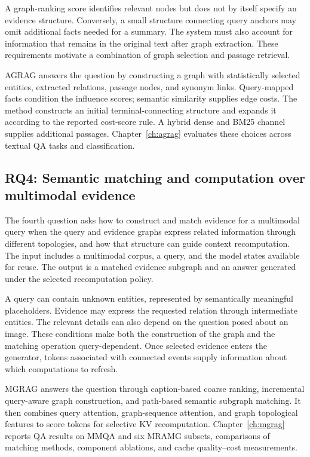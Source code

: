 A graph-ranking score identifies relevant nodes but does not by itself specify an evidence structure. Conversely, a small structure connecting query anchors may omit additional facts needed for a summary. The system must also account for information that remains in the original text after graph extraction. These requirements motivate a combination of graph selection and passage retrieval.

AGRAG answers the question by constructing a graph with statistically selected entities, extracted relations, passage nodes, and synonym links. Query-mapped facts condition the influence scores; semantic similarity supplies edge costs. The method constructs an initial terminal-connecting structure and expands it according to the reported cost-score rule. A hybrid dense and BM25 channel supplies additional passages. Chapter~\ref{ch:agrag} evaluates these choices across textual QA tasks and classification.

\subsection{RQ4: Semantic matching and computation over multimodal evidence}
The fourth question asks how to construct and match evidence for a multimodal query when the query and evidence graphs express related information through different topologies, and how that structure can guide context recomputation. The input includes a multimodal corpus, a query, and the model states available for reuse. The output is a matched evidence subgraph and an answer generated under the selected recomputation policy.

A query can contain unknown entities, represented by semantically meaningful placeholders. Evidence may express the requested relation through intermediate entities. The relevant details can also depend on the question posed about an image. These conditions make both the construction of the graph and the matching operation query-dependent. Once selected evidence enters the generator, tokens associated with connected events supply information about which computations to refresh.

MGRAG answers the question through caption-based coarse ranking, incremental query-aware graph construction, and path-based semantic subgraph matching. It then combines query attention, graph-sequence attention, and graph topological features to score tokens for selective KV recomputation. Chapter~\ref{ch:mgrag} reports QA results on MMQA and six MRAMG subsets, comparisons of matching methods, component ablations, and cache quality--cost measurements.

